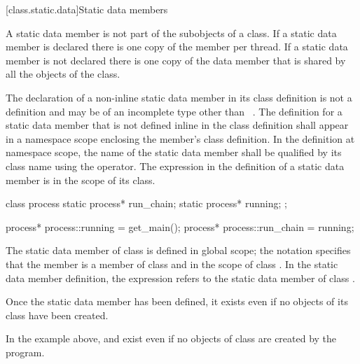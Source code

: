 [class.static.data]{Static data members}
%

\pnum
A static data member is not part of the subobjects of a class. If a
static data member is declared  there is one copy of
the member per thread. If a static data member is not declared
 there is one copy of the data member that is shared by all
the objects of the class.

\pnum
{}%
%
The declaration of a non-inline
static data member in its class definition
is not a definition and may be of an incomplete type other than
\cv{}~. The definition for a static data
member that is not defined inline in the class definition
shall appear in a namespace scope enclosing the member's class
definition.
%
In the definition at namespace scope, the name of the static
data member shall be qualified by its class name using the \tcode{::}
operator. The  expression in the definition of a
static data member is in the scope of its
class.
\begin{example}
\begin{codeblock}
class process {
  static process* run_chain;
  static process* running;
};

process* process::running = get_main();
process* process::run_chain = running;
\end{codeblock}

The static data member  of class
 is defined in global scope; the notation
 specifies that the member 
is a member of class  and in the scope of class
. In the static data member definition, the
 expression refers to the static data
member  of class .
\end{example}

\begin{note}
Once the static data member has been defined, it exists even if
no objects of its class have been created.
\begin{example}
In the example above,  and  exist even
if no objects of class  are created by the program.
\end{example}
\end{note}

